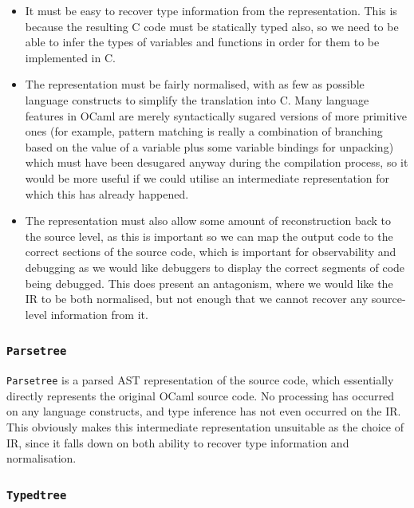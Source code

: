 \documentclass[12pt,a4paper,twoside,openright]{report}
\begin{document}
\begin{itemize}

\item It must be easy to recover type information from the representation. This
    is because the resulting C code must be statically typed also, so we need to
    be able to infer the types of variables and functions in order for them to
    be implemented in C.

\item The representation must be fairly normalised, with as few as possible
    language constructs to simplify the translation into C. Many language
    features in OCaml are merely syntactically sugared versions of more
    primitive ones (for example, pattern matching is really a combination of
    branching based on the value of a variable plus some variable bindings for
    unpacking) which must have been desugared anyway during the compilation
    process, so it would be more useful if we could utilise an intermediate
    representation for which this has already happened.

\item The representation must also allow some amount of reconstruction back to
    the source level, as this is important so we can map the output code to the
    correct sections of the source code, which is important for observability
    and debugging as we would like debuggers to display the correct segments of
    code being debugged. This does present an antagonism, where we would like
    the IR to be both normalised, but not enough that we cannot recover any
    source-level information from it.

\end{itemize}

\subsubsection{\texttt{Parsetree}}

\texttt{Parsetree} is a parsed AST representation of the source code, which 
essentially directly represents the original OCaml source code. No processing 
has occurred on any language constructs, and type inference has not even 
occurred on the IR. This obviously makes this intermediate representation 
unsuitable as the choice of IR, since it falls down on both ability to recover 
type information and normalisation.

\subsubsection{\texttt{Typedtree}}
\end{document}
